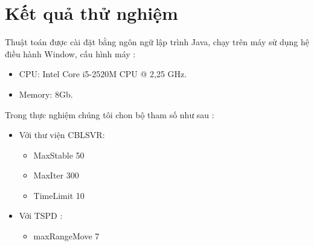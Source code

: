 \documentclass[a4paper,12pt]{report}
\begin{document}
\section{Kết quả thử nghiệm}
Thuật toán được cài đặt bằng ngôn ngữ lập trình Java, chạy trên máy sử dụng hệ điều hành Window, cấu hình máy :
\begin{itemize}
\item CPU: Intel Core i5-2520M CPU @ 2,25 GHz.
\item Memory: 8Gb.
\end{itemize}
Trong thực nghiệm chúng tôi chon bộ tham số như sau : 
\begin{itemize}
\item Với thư viện CBLSVR: \begin{itemize}
\item MaxStable 50
\item MaxIter 300
\item TimeLimit 10
\end{itemize}
\item Với TSPD : \begin{itemize}
\item maxRangeMove 7
\end{itemize}
\end{itemize}
\end{document}
